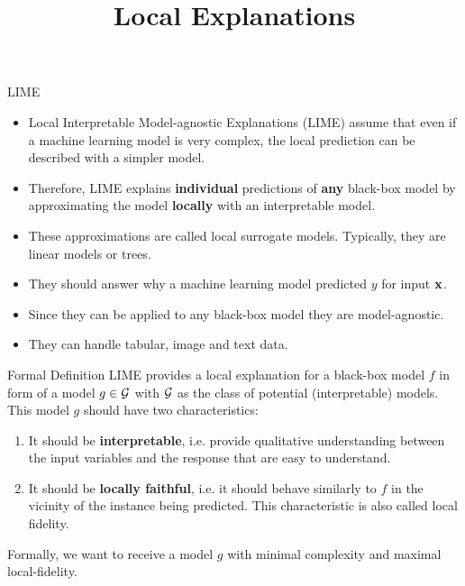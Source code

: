 \documentclass[11pt,compress,t,notes=noshow, xcolor=table]{beamer}
\title{Local Explanations}
\institute{\href{https://compstat-lmu.github.io/lecture_i2ml/}{compstat-lmu.github.io/lecture\_i2ml}}
\date{}
\begin{document}
	
	
	
	
	
	
	
	
	
	

\begin{vbframe}{LIME}
\begin{itemize}
		\item Local Interpretable Model-agnostic Explanations (LIME) assume that even if a machine learning model is very complex, the local prediction can be described with a simpler model.
		\item  Therefore, LIME explains \textbf{individual} predictions of \textbf{any} black-box model by approximating the model \textbf{locally} with an interpretable model.
		\item These approximations are called local surrogate models. Typically, they are linear models or trees.
		\item They should answer why a machine learning model predicted $y$ for input $\xv$.
		\item Since they can be applied to any black-box model they are model-agnostic.  
		\item They can handle tabular, image and text data. 
\end{itemize}
\end{vbframe}

\begin{vbframe}{Formal Definition}
	LIME provides a local explanation for a black-box model $f$ in form of a model $g \in \Gspace$ with $\Gspace$ as the class of potential (interpretable) models. This model $g$ should have two characteristics:
	\begin{enumerate}
		\item It should be \textbf{interpretable}, i.e. provide qualitative understanding between the input variables and the response that are easy to understand.  
		\item It should be \textbf{locally faithful}, i.e. it should behave similarly to $f$ in the vicinity of the instance being predicted. This characteristic is also called local fidelity. 
	\end{enumerate}
	Formally, we want to receive a model $g$ with minimal complexity and maximal local-fidelity. 
\end{vbframe}
\end{document}

